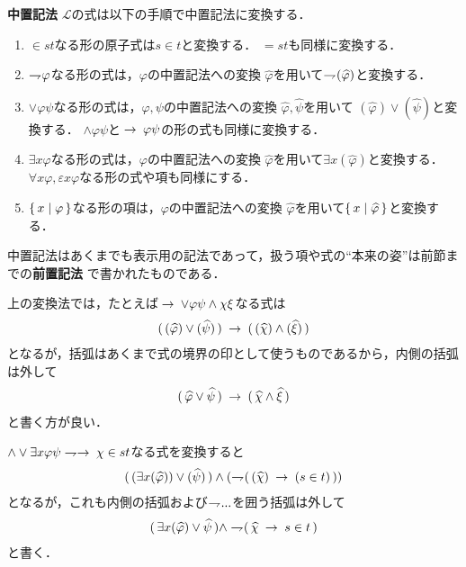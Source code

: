 	\begin{itembox}[l]{{\bf 中置記法}}
			$\mathcal{L}$の式は以下の手順で中置記法に変換する．
			\begin{enumerate}
				\item $\in s t$なる形の原子式は$s \in t$と変換する．
					$= s t$も同様に変換する．
					
				\item $\rightharpoondown\hspace{-0.25em} \varphi$なる形の式は，$\varphi$の中置記法への変換
					$\widehat{\varphi}$を用いて$\rightharpoondown\hspace{-0.25em} (\widehat{\varphi})$と変換する．
				
				\item $\vee \varphi \psi$なる形の式は，$\varphi,\psi$の中置記法への変換
					$\widehat{\varphi},\widehat{\psi}$を用いて
					$(\widehat{\varphi}) \vee (\widehat{\psi})$と変換する．
					$\wedge \varphi \psi$と$\hspace{0.25em}\rightarrow\hspace{0.25em} \varphi \psi$の形の式も同様に変換する．
				
				\item $\exists x \varphi$なる形の式は，$\varphi$の中置記法への変換
					$\widehat{\varphi}$を用いて$\exists x (\widehat{\varphi})$と変換する．
					$\forall x \varphi,\varepsilon x \varphi$なる形の式や項も同様にする．
					
				\item $\{\, x \mid \varphi\, \}$なる形の項は，$\varphi$の中置記法への変換
					$\widehat{\varphi}$を用いて$\{\, x \mid \widehat{\varphi}\, \}$と変換する．
			\end{enumerate}
			中置記法はあくまでも表示用の記法であって，扱う項や式の``本来の姿''は前節までの{\bf 前置記法}
			で書かれたものである．
	\end{itembox}
	
	上の変換法では，たとえば$\hspace{0.25em}\rightarrow\hspace{0.25em} \vee \varphi \psi \wedge \chi \xi$なる式は
	\begin{align}
		(\, (\widehat{\varphi}) \vee (\widehat{\psi})\, ) 
		\hspace{0.25em}\rightarrow\hspace{0.25em} (\, (\widehat{\chi}) \wedge (\widehat{\xi})\, )
	\end{align}
	となるが，括弧はあくまで式の境界の印として使うものであるから，内側の括弧は外して
	\begin{align}
		(\, \widehat{\varphi} \vee \widehat{\psi}\, ) 
		\hspace{0.25em}\rightarrow\hspace{0.25em} (\, \widehat{\chi} \wedge \widehat{\xi}\, )
	\end{align}
	と書く方が良い．
	
	$\wedge \vee \exists x \varphi \psi \negation \rarrow \chi \in s t$なる式を変換すると
	\begin{align}
		(\, (\exists x (\widehat{\varphi})) \vee (\widehat{\psi})\, ) \wedge (\rightharpoondown\hspace{-0.25em} (\, (\widehat{\chi}) \hspace{0.25em}\rightarrow\hspace{0.25em} (s \in t)\, ))
	\end{align}
	となるが，これも内側の括弧および$\rightharpoondown\hspace{-0.25em} ...$を囲う括弧は外して
	\begin{align}
		(\, \exists x (\widehat{\varphi}) \vee \widehat{\psi}\, ) \wedge \rightharpoondown\hspace{-0.25em} (\, \widehat{\chi} \hspace{0.25em}\rightarrow\hspace{0.25em} s \in t\, )
	\end{align}
	と書く．
	
